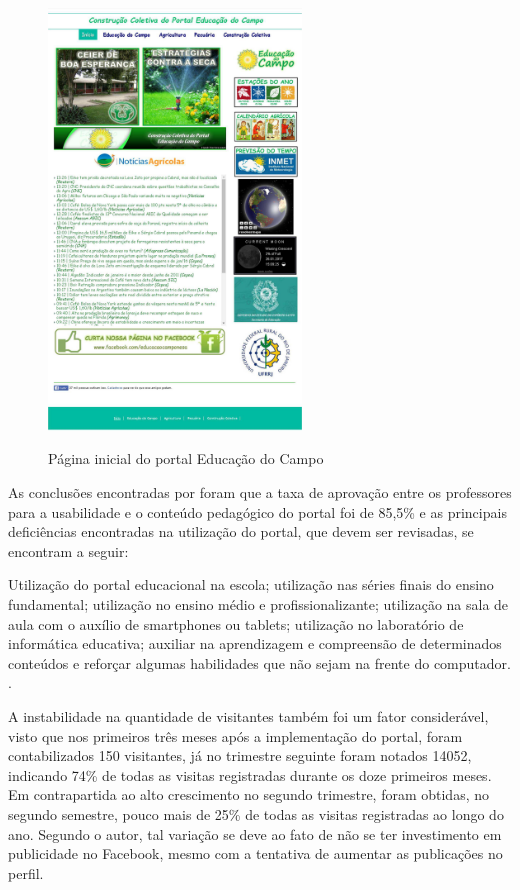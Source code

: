 \begin{figure}[htb]
 \centering
 \caption{Página inicial do portal Educação do Campo}
 \includegraphics[width=0.6\textwidth]{figuras/pInicial-Centro}
 \label{pagina-inicial-portal}
\end{figure}

\newpage

As conclusões encontradas por  foram que a taxa de aprovação entre os professores para a usabilidade e o conteúdo pedagógico do portal foi de 85,5\% e as principais deficiências encontradas na utilização do portal, que devem ser revisadas, se encontram a seguir:

\begin{citacao}
 Utilização do portal educacional na escola; utilização nas séries finais do ensino fundamental; utilização no ensino médio e profissionalizante; utilização na sala de aula com o auxílio de smartphones ou tablets; utilização no laboratório de
informática educativa; auxiliar na aprendizagem e compreensão de determinados conteúdos e reforçar algumas habilidades que não sejam na frente do computador. \cite{soares2017construccao}. 
\end{citacao}

A instabilidade na quantidade de visitantes também foi um fator considerável, visto que nos primeiros três meses após a implementação do portal, foram contabilizados 150 visitantes, já no trimestre seguinte foram notados 14052, indicando 74\% de todas as visitas registradas durante os doze primeiros meses. Em contrapartida ao alto crescimento no segundo trimestre, foram obtidas, no segundo semestre, pouco mais de 25\% de todas as visitas registradas ao longo do ano. Segundo o autor, tal variação se deve ao fato de não se ter investimento em publicidade no Facebook, mesmo com a tentativa de aumentar as publicações no perfil.



